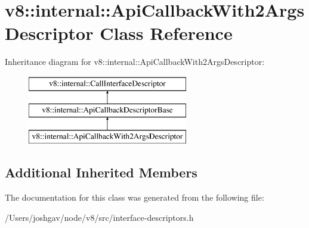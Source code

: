 \hypertarget{classv8_1_1internal_1_1_api_callback_with2_args_descriptor}{}\section{v8\+:\+:internal\+:\+:Api\+Callback\+With2\+Args\+Descriptor Class Reference}
\label{classv8_1_1internal_1_1_api_callback_with2_args_descriptor}
Inheritance diagram for v8\+:\+:internal\+:\+:Api\+Callback\+With2\+Args\+Descriptor\+:\begin{figure}[H]
\begin{center}
\leavevmode
\includegraphics[height=3.000000cm]{classv8_1_1internal_1_1_api_callback_with2_args_descriptor}
\end{center}
\end{figure}
\subsection*{Additional Inherited Members}


The documentation for this class was generated from the following file\+:\begin{DoxyCompactItemize}
\item 
/\+Users/joshgav/node/v8/src/interface-\/descriptors.\+h\end{DoxyCompactItemize}
